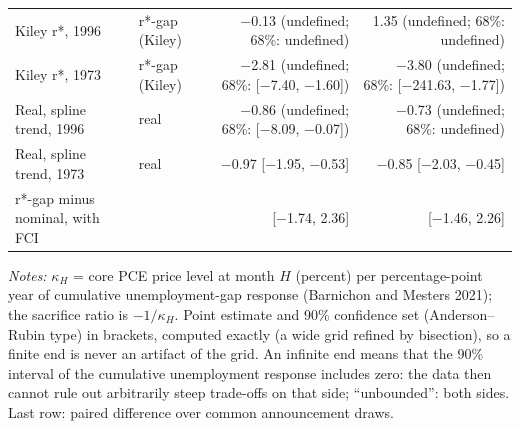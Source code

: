 \begin{table}[tp]
{\begin{tabular}{llrr}
Kiley r*, 1996 & r*-gap (Kiley) & $-$0.13 (undefined; 68\%: undefined) & 1.35 (undefined; 68\%: undefined)\\
Kiley r*, 1973 & r*-gap (Kiley) & $-$2.81 (undefined; 68\%: [$-$7.40, $-$1.60]) & $-$3.80 (undefined; 68\%: [$-$241.63, $-$1.77])\\
Real, spline trend, 1996 & real & $-$0.86 (undefined; 68\%: [$-$8.09, $-$0.07]) & $-$0.73 (undefined; 68\%: undefined)\\
Real, spline trend, 1973 & real & $-$0.97 [$-$1.95, $-$0.53] & $-$0.85 [$-$2.03, $-$0.45]\\
\addlinespace
r*-gap minus nominal, with FCI & & [$-$1.74, 2.36] & [$-$1.46, 2.26]\\
\bottomrule\end{tabular}}
\begin{flushleft}\footnotesize\textit{Notes:} $\kappa_H$ = core PCE price level at month $H$ (percent) per percentage-point year of cumulative unemployment-gap response (Barnichon and Mesters 2021); the sacrifice ratio is $-1/\kappa_H$. Point estimate and 90\% confidence set (Anderson--Rubin type) in brackets, computed exactly (a wide grid refined by bisection), so a finite end is never an artifact of the grid. An infinite end means that the 90\% interval of the cumulative unemployment response includes zero: the data then cannot rule out arbitrarily steep trade-offs on that side; ``unbounded'': both sides. Last row: paired difference over common announcement draws.\end{flushleft}
\end{table}
